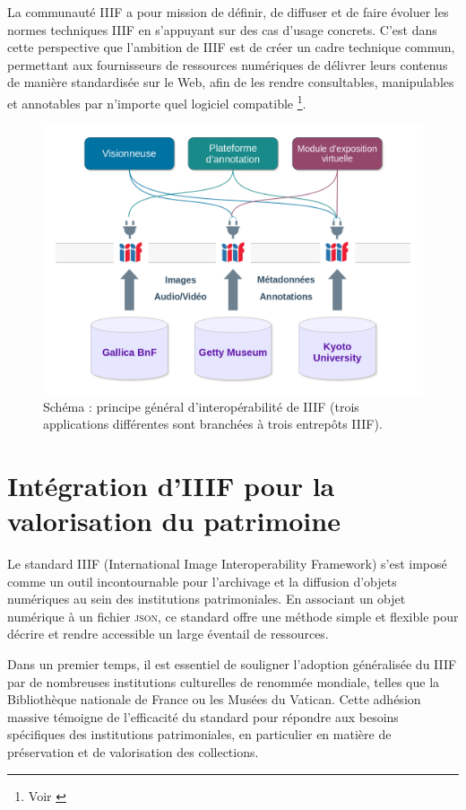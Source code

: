     La communauté IIIF a pour mission de définir, de diffuser et de faire évoluer les normes techniques IIIF en s'appuyant sur des cas d'usage concrets. C'est dans cette perspective que l'ambition de IIIF est de créer un cadre technique commun, permettant aux fournisseurs de ressources numériques de délivrer leurs contenus de manière standardisée sur le Web, afin de les rendre consultables, manipulables et annotables par n'importe quel logiciel compatible \footnote{Voir \cite{biblissima_iiif_intro}}.

        \begin{figure}[h!]
            \centering
            \includegraphics[width=12cm]{02_images/part_01/09_schema_iiif.png}
            \caption{Schéma : principe général d’interopérabilité de IIIF (trois applications différentes sont branchées à trois entrepôts IIIF).}
        \end{figure}
     
    \section{Intégration d'IIIF pour la valorisation du patrimoine}
    
    Le standard IIIF (International Image Interoperability Framework) s'est imposé comme un outil incontournable pour l'archivage et la diffusion d'objets numériques au sein des institutions patrimoniales. En associant un objet numérique à un fichier \textsc{json}, ce standard offre une méthode simple et flexible pour décrire et rendre accessible un large éventail de ressources.

    Dans un premier temps, il est essentiel de souligner l'adoption généralisée du IIIF par de nombreuses institutions culturelles de renommée mondiale, telles que la Bibliothèque nationale de France ou les Musées du Vatican. Cette adhésion massive témoigne de l'efficacité du standard pour répondre aux besoins spécifiques des institutions patrimoniales, en particulier en matière de préservation et de valorisation des collections.
    

